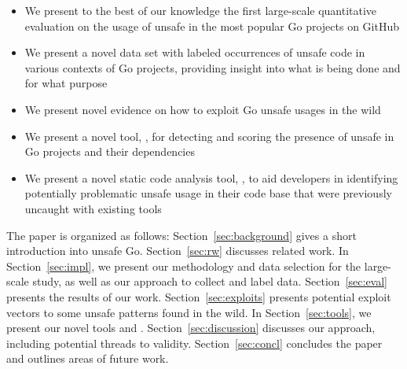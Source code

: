 \begin{itemize}
\item We present to the best of our knowledge the first large-scale quantitative evaluation on the usage of unsafe in the \projsAnalyzed{} most popular Go projects on GitHub
\item We present a novel data set with  labeled occurrences of unsafe code in various contexts of Go projects, providing insight into what is being done and for what purpose
\item We present novel evidence on how to exploit Go unsafe usages in the wild
\item We present a novel tool, \toolUsage{}, for detecting and scoring the presence of unsafe in Go projects and their dependencies
\item We present a novel static code analysis tool, \toolSA{}, to aid developers in identifying potentially problematic unsafe usage in their code base that were previously uncaught with existing tools
\end{itemize}

The paper is organized as follows:
Section~\ref{sec:background} gives a short introduction into unsafe Go.
Section~\ref{sec:rw} discusses related work. 
In Section~\ref{sec:impl}, we present our methodology and data selection for the large-scale study, as well as our approach to collect and label data.
Section~\ref{sec:eval} presents the results of our work.
Section~\ref{sec:exploits} presents potential exploit vectors to some unsafe patterns found in the wild.
In Section~\ref{sec:tools}, we present our novel tools \toolUsage{} and \toolSA{}.
Section~\ref{sec:discussion} discusses our approach, including potential threads to validity.
Section~\ref{sec:concl} concludes the paper and outlines areas of future work.
